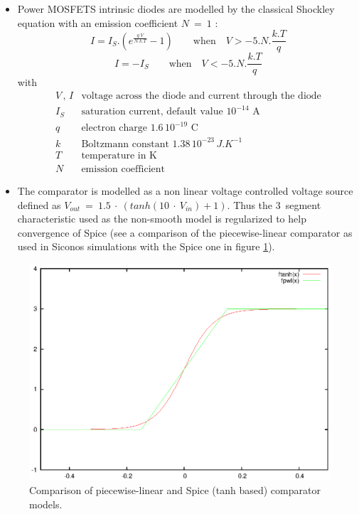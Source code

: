 \begin{itemize}
\item Power MOSFETS intrinsic diodes are modelled by the classical Shockley equation with an emission
coefficient $N~=~1$ :
\[ I = I_S.({e^{\frac{q.V}{N.k.T}} - 1}) \qquad \textrm{when} \quad V > -5.N.\frac{k.T}{q} \]
\[ I = -I_S \qquad  \textrm{when} \quad V < -5.N.\frac{k.T}{q} \]
with
\[
\begin{array}{ll}
V\,,\,I & \textrm{voltage across the diode and current through the diode}\\
I_S & \textrm{saturation current, default value $10^{-14}$~A}\\
q & \textrm{electron charge $1.6\,10^{-19}$~C}\\
k & \textrm{Boltzmann constant $1.38\,10^{-23}\,J.K^{-1}$}\\
T & \textrm{temperature in K}\\
N & \textrm{emission coefficient}
\end{array}
\]
\item The comparator is modelled as a non linear voltage controlled voltage source defined as $V_{out}~=~1.5~\cdot~(tanh(10~\cdot~V_{in}) + 1)$. Thus the 3~segment characteristic used as the non-smooth model is regularized to help convergence of {\sc Spice}
(see a comparison of the piecewise-linear comparator as used in {\sc Siconos} simulations with the {\sc Spice} one in figure \ref{fig-comparator-models}).
\end{itemize}

\begin{figure}[hbtp]
\begin{center}
\includegraphics[scale=0.6,angle=0]{./figure/comparators.eps}
\end{center}
\caption{Comparison of piecewise-linear and {\sc Spice} (tanh based) comparator models.}
\label{fig-comparator-models}
\end{figure}




